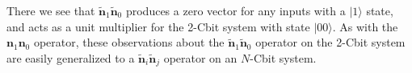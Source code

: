 \documentclass{article}
\begin{document}
There we see that $\bm{\widetilde{n}}_1\bm{\widetilde{n}}_0$ produces a zero vector for any inputs with a $|1\rangle$ state, and acts as a unit multiplier for the 2-Cbit system with state $|00\rangle$. As with the $\bm{n}_1\bm{n}_0$ operator, these observations about the $\bm{\widetilde{n}}_1\bm{\widetilde{n}}_0$ operator on the 2-Cbit system are easily generalized to a $\bm{\widetilde{n}}_i\bm{\widetilde{n}}_j$ operator on an $N$-Cbit system.



\printbibliography
\end{document}
